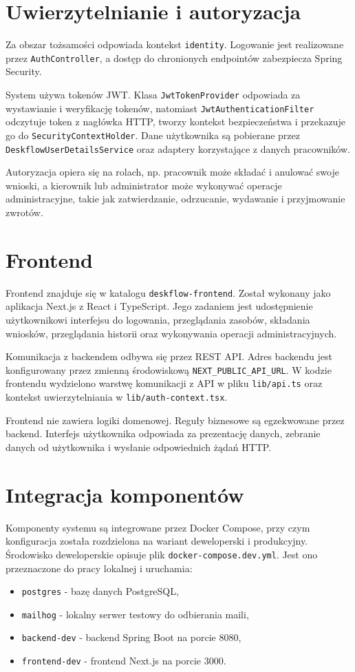 \section{Uwierzytelnianie i autoryzacja}

Za obszar tożsamości odpowiada kontekst \texttt{identity}. Logowanie jest realizowane przez \texttt{AuthController}, a dostęp do chronionych endpointów zabezpiecza Spring Security.

System używa tokenów JWT. Klasa \texttt{JwtTokenProvider} odpowiada za wystawianie i weryfikację tokenów, natomiast \texttt{JwtAuthenticationFilter} odczytuje token z nagłówka HTTP, tworzy kontekst bezpieczeństwa i przekazuje go do \texttt{SecurityContextHolder}. Dane użytkownika są pobierane przez \texttt{DeskflowUserDetailsService} oraz adaptery korzystające z danych pracowników.

Autoryzacja opiera się na rolach, np. pracownik może składać i anulować swoje wnioski, a kierownik lub administrator może wykonywać operacje administracyjne, takie jak zatwierdzanie, odrzucanie, wydawanie i przyjmowanie zwrotów.

\section{Frontend}

Frontend znajduje się w katalogu \texttt{deskflow-frontend}. Został wykonany jako aplikacja Next.js z React i TypeScript. Jego zadaniem jest udostępnienie użytkownikowi interfejsu do logowania, przeglądania zasobów, składania wniosków, przeglądania historii oraz wykonywania operacji administracyjnych.

Komunikacja z backendem odbywa się przez REST API. Adres backendu jest konfigurowany przez zmienną środowiskową \texttt{NEXT\_PUBLIC\_API\_URL}. W kodzie frontendu wydzielono warstwę komunikacji z API w pliku \texttt{lib/api.ts} oraz kontekst uwierzytelniania w \texttt{lib/auth-context.tsx}.

Frontend nie zawiera logiki domenowej. Reguły biznesowe są egzekwowane przez backend. Interfejs użytkownika odpowiada za prezentację danych, zebranie danych od użytkownika i wysłanie odpowiednich żądań HTTP.

\section{Integracja komponentów}

Komponenty systemu są integrowane przez Docker Compose, przy czym konfiguracja została rozdzielona na wariant deweloperski i produkcyjny. Środowisko deweloperskie opisuje plik \texttt{docker-compose.dev.yml}. Jest ono przeznaczone do pracy lokalnej i uruchamia:
\begin{itemize}
    \item \texttt{postgres} - bazę danych PostgreSQL,
    \item \texttt{mailhog} - lokalny serwer testowy do odbierania maili,
    \item \texttt{backend-dev} - backend Spring Boot na porcie 8080,
    \item \texttt{frontend-dev} - frontend Next.js na porcie 3000.
\end{itemize}

